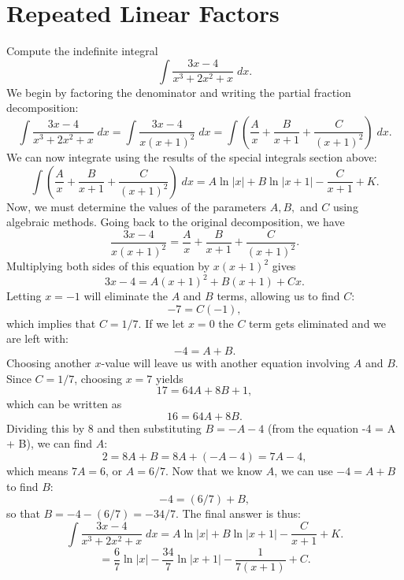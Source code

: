 \documentclass{ximera}
\begin{document}
\section{Repeated Linear Factors}


\begin{example}[example 6]
Compute the indefinite integral
\[
\int \frac{3x - 4}{x^3 + 2x^2 + x} \; dx.
\]
We begin by factoring the denominator and writing the partial fraction decomposition:
\[
\int \frac{3x - 4}{x^3 + 2x^2 + x} \; dx = \int \frac{3x - 4}{x(x+1)^2} \; dx = \int \left(\frac{A}{x} + \frac{B}{x+1} + \frac{C}{(x+1)^2} \right) \; dx.
\]
We can now integrate using the results of the special integrals section above:
\[
\int \left(\frac{A}{x} + \frac{B}{x+1} + \frac{C}{(x+1)^2} \right) \; dx = A\ln|x| + B\ln|x+1| - \frac{C}{x+1} + K.
\]
Now, we must determine the values of the parameters $A, B, $ and $C$ using algebraic methods.
Going back to the original decomposition, we have
\[
\frac{3x - 4}{x(x+1)^2} = \frac{A}{x} + \frac{B}{x+1} + \frac{C}{(x+1)^2}.
\]
Multiplying both sides of this equation by $x(x+1)^2$ gives
\[
3x-4 = A(x+1)^2 + B(x+1) + Cx.
\]
Letting $x = -1$ will eliminate the $A$ and $B$ terms, allowing us to find $C$:
\[
-7 = C(-1),
\]
which implies that $C = 1/7$.  If we let $x = 0$ the $C$ term gets eliminated and we are left with:
\[
-4 = A + B.
\]
Choosing another $x$-value will leave us with another equation involving $A$ and $B$.  Since $C = 1/7$, choosing $x = 7$ yields
\[
17 = 64A + 8B + 1,
\]
which can be written as 
\[
16 = 64A + 8B.
\]
Dividing this by 8 and then substituting $B = -A - 4$ (from the equation -4 = A + B), we can find $A$:
\[
2 = 8A + B = 8A + (-A-4) = 7A -4,
\]
which means $7A = 6$, or $A = 6/7$.
Now that we know $A$, we can use $-4 = A + B$ to find $B$:
\[
-4 = (6/7) + B,
\]
so that $B = -4 - (6/7) = -34/7$. The final answer is thus:
\[
\int \frac{3x - 4}{x^3 + 2x^2 + x} \; dx = A\ln|x| + B\ln|x+1| - \frac{C}{x+1} + K.
\]
\[
= \frac67\ln|x| -\frac{34}{7}\ln|x+1| - \frac{1}{7(x+1)} + C.
\]

\end{example}



\begin{center}
\begin{foldable}
\end{foldable}
\end{center}
\end{document}
